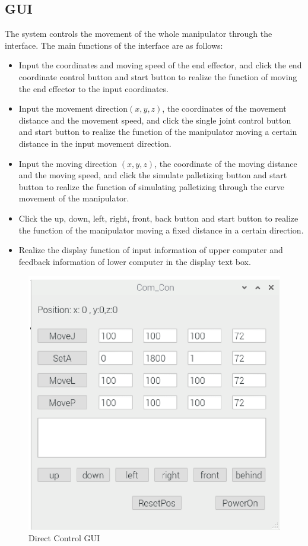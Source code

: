 \documentclass{hci}
\begin{document}
\subsection{GUI}
The system controls the movement of the whole manipulator through the interface. The main functions of the interface are as follows:
\begin{itemize}
	\item Input the coordinates and moving speed of the end effector, and click the end coordinate control button and start button to realize the function of moving the end effector to the input coordinates.
	\item Input the movement direction$(x, y, z)$, the coordinates of the movement distance and the movement speed, and click the single joint control button and start button to realize the function of the manipulator moving a certain distance in the input movement direction.
	\item Input the moving direction $(x, y, z)$, the coordinate of the moving distance and the moving speed, and click the simulate palletizing button and start button to realize the function of simulating palletizing through the curve movement of the manipulator.
	\item Click the up, down, left, right, front, back button and start button to realize the function of the manipulator moving a fixed distance in a certain direction.
	\item Realize the display function of input information of upper computer and feedback information of lower computer in the display text box.
\end{itemize}
\begin{figure}[htbp]
	\centering
	\includegraphics[width=0.7\linewidth]{figures/GUI}
	\caption{Direct Control GUI}
	\label{fig:GUI}
\end{figure}
\end{document}
